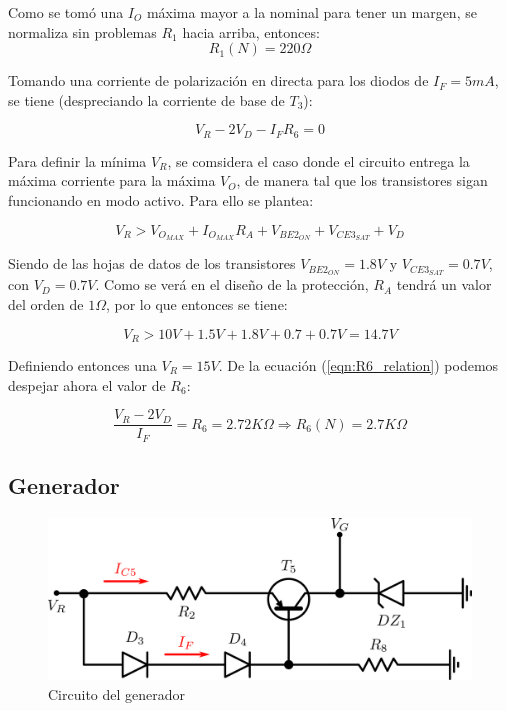 Como se tom\'o una $I_O$ m\'axima mayor a la nominal para tener un margen, se normaliza sin problemas $R_1$ hacia arriba, entonces:
$$R_1(N) = 220\Omega$$

Tomando una corriente de polarizaci\'on en directa para los diodos de $I_F = 5mA$, se tiene (despreciando la corriente de base de $T_3$):

\begin{equation}
V_R - 2V_D - I_FR_6 = 0
\label{eqn:R6_relation}
\end{equation}

Para definir la m\'inima $V_R$, se comsidera el caso donde el circuito entrega la m\'axima corriente para la m\'axima $V_O$, de manera tal que los transistores sigan funcionando en modo activo. Para ello se plantea:

$$V_R > V_{O_{MAX}} + I_{O_{MAX}}R_A + V_{BE2_{ON}} + V_{CE3_{SAT}} + V_D$$

Siendo de las hojas de datos de los transistores $V_{BE2_{ON}} = 1.8V$ y $V_{CE3_{SAT}} = 0.7V$, con $V_D = 0.7V$. Como se ver\'a en el dise\~no de la protecci\'on, $R_A$ tendr\'a un valor del orden de $1\Omega$, por lo que entonces se tiene:

$$V_R > 10V + 1.5V + 1.8V + 0.7 + 0.7V = 14.7V$$

Definiendo entonces una $V_R = 15V$. De la ecuaci\'on (\ref{eqn:R6_relation}) podemos despejar ahora el valor de $R_6$:

$$\frac{V_R - 2V_D}{I_F} = R_6 = 2.72K\Omega \Longrightarrow R_6(N) = 2.7K\Omega$$ 


\subsection{Generador}

\begin{figure}[!h]
\begin{centering}
\includegraphics[scale=0.34]{Imagenes/Generador.png}
\par\end{centering}
\caption{Circuito del generador}

\end{figure}

